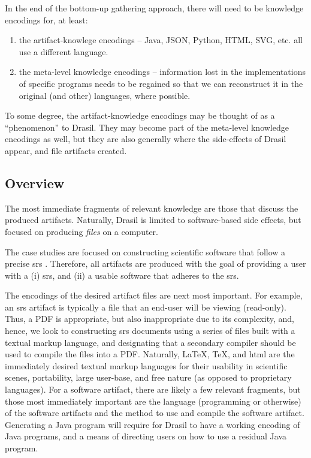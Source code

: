 In the end of the bottom-up gathering approach, there will need to be knowledge
encodings for, at least:

\begin{enumerate}

      \item the artifact-knowlege encodings -- Java, JSON, Python, HTML, SVG,
            etc. all use a different language.

      \item the meta-level knowledge encodings -- information lost in the
            implementations of specific programs needs to be regained so that we
            can reconstruct it in the original (and other) languages, where
            possible.

\end{enumerate}

To some degree, the artifact-knowledge encodings may be thought of as a
``phenomenon'' to Drasil. They may become part of the meta-level knowledge
encodings as well, but they are also generally where the side-effects of Drasil
appear, and file artifacts created.

\subsection{Overview}

The most immediate fragments of relevant knowledge are those that discuss the
produced artifacts. Naturally, Drasil is limited to software-based side effects,
but focused on producing \textit{files} on a computer.

The case studies are focused on constructing scientific software that follow a
precise \acs{srs} \cite{SmithAndLai2005}. Therefore, all artifacts are
produced with the goal of providing a user with a (i) \acl{srs}, and (ii) a
usable software that adheres to the \acl{srs}.

The encodings of the desired artifact files are next most important. For
example, an \acs{srs} artifact is typically a file that an end-user will be
viewing (read-only). Thus, a PDF is appropriate, but also inappropriate due to
its complexity, and, hence, we look to constructing \acs{srs} documents using a
series of files built with a textual markup language, and designating that a
secondary compiler should be used to compile the files into a PDF. Naturally,
\LaTeX{}, \TeX{}, and \acs{html} are the immediately desired textual markup
languages for their usability in scientific scenes, portability, large
user-base, and free nature (as opposed to proprietary languages). For a software
artifact, there are likely a few relevant fragments, but those most immediately
important are the language (programming or otherwise) of the software artifacts
and the method to use and compile the software artifact. Generating a Java
program will require for Drasil to have a working encoding of Java programs, and
a means of directing users on how to use a residual Java program.

